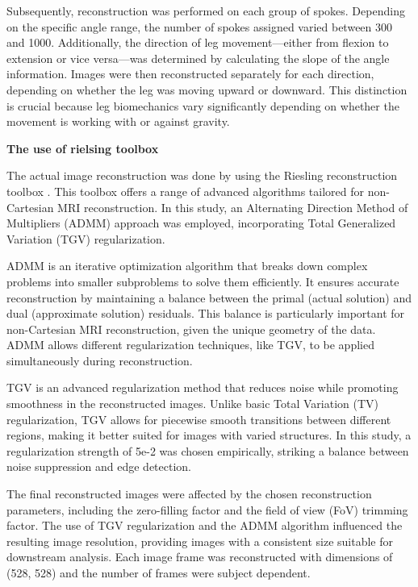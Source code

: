 \documentclass{micro-econ-thesis}
\begin{document}
Subsequently, reconstruction was performed on each group of spokes. Depending on the specific angle range, the number of spokes assigned varied between 300 and 1000. Additionally, the direction of leg movement—either from flexion to extension or vice versa—was determined by calculating the slope of the angle information. Images were then reconstructed separately for each direction, depending on whether the leg was moving upward or downward. This distinction is crucial because leg biomechanics vary significantly depending on whether the movement is working with or against gravity.

\textbf{The use of rielsing toolbox}

The actual image reconstruction was done by using the Riesling reconstruction toolbox \parencite{wood2020riesling}. This toolbox offers a range of advanced algorithms tailored for non-Cartesian MRI reconstruction. In this study, an Alternating Direction Method of Multipliers (ADMM) approach was employed, incorporating Total Generalized Variation (TGV) regularization. 

ADMM is an iterative optimization algorithm that breaks down complex problems into smaller subproblems to solve them efficiently. It ensures accurate reconstruction by maintaining a balance between the primal (actual solution) and dual (approximate solution) residuals. This balance is particularly important for non-Cartesian MRI reconstruction, given the unique geometry of the data. ADMM allows different regularization techniques, like TGV, to be applied simultaneously during reconstruction.\parencite{MAL-016} 

TGV is an advanced regularization method that reduces noise while promoting smoothness in the reconstructed images. Unlike basic Total Variation (TV) regularization, TGV allows for piecewise smooth transitions between different regions, making it better suited for images with varied structures. In this study, a regularization strength of 5e-2 was chosen empirically, striking a balance between noise suppression and edge detection.

The final reconstructed images were affected by the chosen reconstruction parameters, including the zero-filling factor and the field of view (FoV) trimming factor. The use of TGV regularization and the ADMM algorithm influenced the resulting image resolution, providing images with a consistent size suitable for downstream analysis. Each image frame was reconstructed with dimensions of (528, 528) and the number of frames were subject dependent. 
\end{document}
